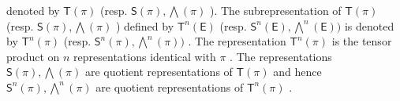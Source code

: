 denoted by \(\mathsf{T}(\pi)\) (resp. \(\mathsf{S}(\pi),\bigwedge (\pi)\) ). The subrepresentation of \(\mathsf{T}(\pi)\) (resp. \(\mathsf{S}(\pi),\bigwedge (\pi)\) ) defined by \(\mathsf{T}^n (\mathsf{E})\) (resp. \(\mathsf{S}^n (\mathsf{E}),\bigwedge^n (\mathsf{E}))\) is denoted by \(\mathsf{T}^n (\pi)\) (resp. \(\mathsf{S}^n (\pi),\bigwedge^n (\pi))\) . The representation \(\mathsf{T}^n (\pi)\) is the tensor product on \(n\) representations identical with \(\pi\) . The representations \(\mathsf{S}(\pi),\bigwedge (\pi)\) are quotient representations of \(\mathsf{T}(\pi)\) and hence \(\mathsf{S}^n (\pi),\bigwedge^n (\pi)\) are quotient representations of \(\mathsf{T}^n (\pi)\) .

